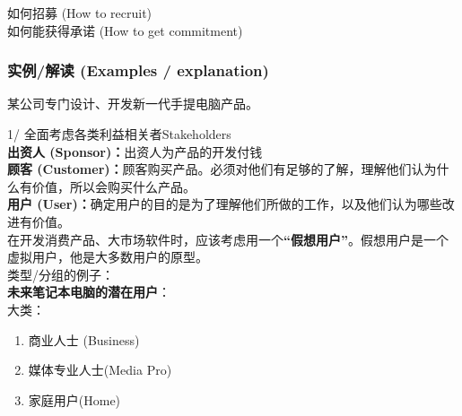 \begin{description}
\tightlist
\item[]
如何招募 (How to recruit)\\

如何能获得承诺 (How to get commitment)\\
\end{description}

\begin{description}
\item[]
\end{description}

\hypertarget{ux5b9eux4f8bux89e3ux8bfb-examples-explanation}{%
\subsubsection{\texorpdfstring{\textbf{实例/解读 (Examples /
explanation)}}{实例/解读 (Examples / explanation)}}\label{ux5b9eux4f8bux89e3ux8bfb-examples-explanation}}

某公司专门设计、开发新一代手提电脑产品。

1/ 全面考虑各类利益相关者Stakeholders\\
\textbf{出资人 (Sponsor)：}出资人为产品的开发付钱\\
\textbf{顾客
(Customer)：}顾客购买产品。必须对他们有足够的了解，理解他们认为什么有价值，所以会购买什么产品。\\
\textbf{用户
(User)：}确定用户的目的是为了理解他们所做的工作，以及他们认为哪些改进有价值。\\
在开发消费产品、大市场软件时，应该考虑用一个\textbf{``假想用户''}。假想用户是一个虚拟用户，他是大多数用户的原型。\\
类型/分组的例子：\\
\textbf{未来笔记本电脑的潜在用户}：\\
大类：\\

\begin{enumerate}
\tightlist
\item
  商业人士 (Business)
\item
  媒体专业人士(Media Pro)
\item
  家庭用户(Home)
\end{enumerate}

